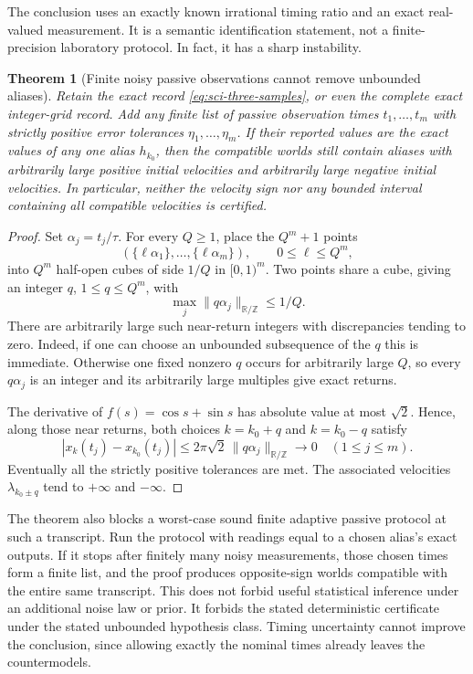 \documentclass[11pt]{article}
\newtheorem{theorem}{Theorem}[section]
\theoremstyle{definition}
\begin{document}
The conclusion uses an exactly known irrational timing ratio and an exact
real-valued measurement. It is a semantic identification statement, not a
finite-precision laboratory protocol. In fact, it has a sharp instability.

\begin{theorem}[Finite noisy passive observations cannot remove unbounded aliases]
\label{thm:sci-noisy-passive}
Retain the exact record \eqref{eq:sci-three-samples}, or even the complete
exact integer-grid record. Add any finite list of passive observation times
$t_1,\ldots,t_m$ with strictly positive error tolerances
$\eta_1,\ldots,\eta_m$. If their reported values are the exact values of
any one alias $h_{k_0}$, then the compatible worlds still contain aliases
with arbitrarily large positive initial velocities and arbitrarily large
negative initial velocities. In particular, neither the velocity sign nor
any bounded interval containing all compatible velocities is certified.
\end{theorem}
\begin{proof}
Set $\alpha_j=t_j/\tau$. For every $Q\geq1$, place the $Q^m+1$ points
\[
 (\{\ell\alpha_1\},\ldots,\{\ell\alpha_m\}),
 \qquad 0\leq\ell\leq Q^m,
\]
into $Q^m$ half-open cubes of side $1/Q$ in $[0,1)^m$.
Two points share a cube, giving an integer $q$, $1\leq q\leq Q^m$, with
\[
 \max_j\|q\alpha_j\|_{\mathbb R/\mathbb Z}\leq 1/Q.
\]
There are arbitrarily large such near-return integers with discrepancies
tending to zero. Indeed, if one can choose an unbounded subsequence of the
$q$ this is immediate. Otherwise one fixed nonzero $q$ occurs for
arbitrarily large $Q$, so every $q\alpha_j$ is an integer and its arbitrarily
large multiples give exact returns.

The derivative of $f(s)=\cos s+\sin s$ has absolute value at most $\sqrt2$.
Hence, along those near returns, both choices $k=k_0+q$ and $k=k_0-q$
satisfy
\[
 |x_k(t_j)-x_{k_0}(t_j)|
 \leq 2\pi\sqrt2\,
       \|q\alpha_j\|_{\mathbb R/\mathbb Z}\longrightarrow0
 \quad(1\leq j\leq m).
\]
Eventually all the strictly positive tolerances are met. The associated
velocities $\lambda_{k_0\pm q}$ tend to $+\infty$ and $-\infty$.
\end{proof}

The theorem also blocks a worst-case sound finite adaptive passive
protocol at such a transcript. Run the protocol with readings equal to a
chosen alias's exact outputs. If it stops after finitely many noisy
measurements, those chosen times form a finite list, and the proof produces
opposite-sign worlds compatible with the entire same transcript. This does
not forbid useful statistical inference under an additional noise law or
prior. It forbids the stated deterministic certificate under the stated
unbounded hypothesis class. Timing uncertainty cannot improve the conclusion,
since allowing exactly the nominal times already leaves the countermodels.
\end{document}
